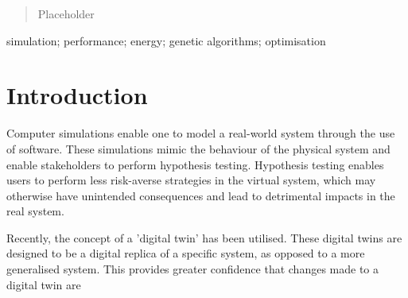 \documentclass[10pt, conference, compsocconf]{IEEEtran}
\begin{document}




\maketitle

\begin{abstract}
Placeholder

\end{abstract}

\begin{IEEEkeywords}
simulation; performance; energy; genetic algorithms; optimisation

\end{IEEEkeywords}


%
\IEEEpeerreviewmaketitle


\section{Introduction}

Computer simulations enable one to model a real-world system through the use of software. These simulations mimic the behaviour of the physical system and enable stakeholders to perform hypothesis testing. Hypothesis testing enables users to perform less risk-averse strategies in the virtual system, which may otherwise have unintended consequences and lead to detrimental impacts in the real system. 

Recently, the concept of a 'digital twin' has been utilised. These digital twins are designed to be a digital replica of a specific system, as opposed to a more generalised system. This provides greater confidence that changes made to a digital twin are 
\end{document}
